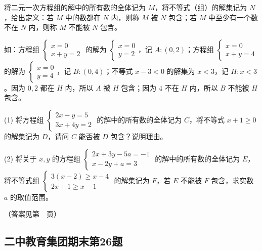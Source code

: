 将二元一次方程组的解中的所有数的全体记为 \(M\)，将不等式（组）的解集记为 \(N\)，给出定义：若 \(M\) 中的数都在 \(N\) 内，则称 \(M\) 被 \(N\) 包含；若 \(M\) 中至少有一个数不在 \(N\) 内，则称 \(M\) 不能被 \(N\) 包含。

如：方程组 \(\begin{cases} x = 0 \\ x + y = 2 \end{cases}\) 的解为 \(\begin{cases} x = 0 \\ y = 2 \end{cases}\)，记 \(A: (0, 2)\)；方程组 \(\begin{cases} x = 0 \\ x + y = 4 \end{cases}\) 的解为 \(\begin{cases} x = 0 \\ y = 4 \end{cases}\)，记 \(B: (0, 4)\)；不等式 \(x - 3 < 0\) 的解集为 \(x < 3\)，记 \(H: x < 3\)。因为 \(0, 2\) 都在 \(H\) 内，所以 \(A\) 被 \(H\) 包含；因为 \(4\) 不在 \(H\) 内，所以 \(B\) 不能被 \(H\) 包含。

(1) 将方程组 \(\begin{cases} 2x - y = 5 \\ 3x + 4y = 2 \end{cases}\) 的解中的所有数的全体记为 \(C\)，将不等式 \(x + 1 \geq 0\) 的解集记为 \(D\)，请问 \(C\) 能否被 \(D\) 包含？说明理由。

\vspace{5cm}

(2) 将关于 \(x, y\) 的方程组 \(\begin{cases} 2x + 3y - 5a = -1 \\ x - 2y + a = 3 \end{cases}\) 的解中的所有数的全体记为 \(E\)，将不等式组 \(\begin{cases} 3(x - 2) \geq x - 4 \\ 2x + 1 \geq x - 1 \end{cases}\) 的解集记为 \(F\)，若 \(E\) 不能被 \(F\) 包含，求实数 \(a\) 的取值范围。

\vspace{7cm}


（答案见第~\pageref{新定义-集合思想}~页）


\subsection{二中教育集团期末第26题}

